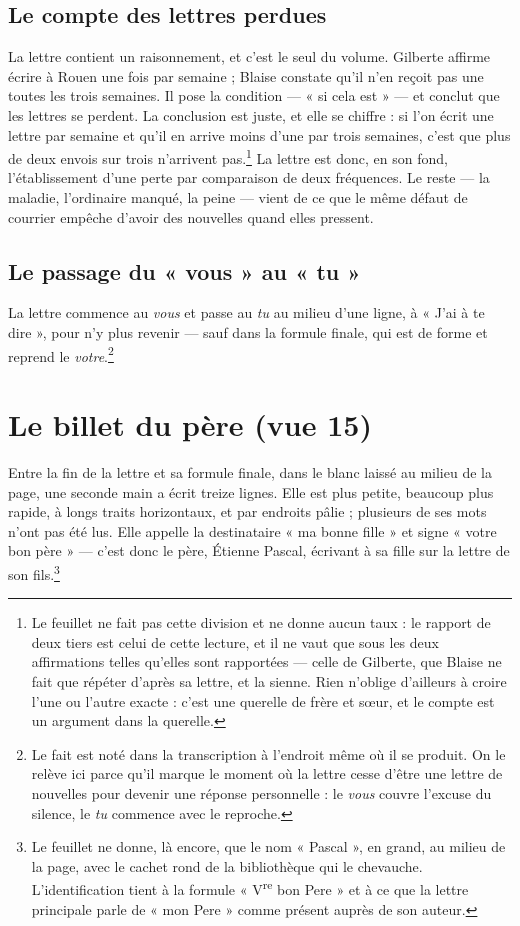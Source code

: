 \documentclass[11pt,a4paper]{article}
\begin{document}
\subsection*{Le compte des lettres perdues}

La lettre contient un raisonnement, et c'est le seul du volume. Gilberte
affirme écrire à Rouen une fois par semaine ; Blaise constate qu'il n'en reçoit
pas une toutes les trois semaines. Il pose la condition — « si cela est » — et
conclut que les lettres se perdent. La conclusion est juste, et elle se
chiffre : si l'on écrit une lettre par semaine et qu'il en arrive moins d'une
par trois semaines, c'est que plus de deux envois sur trois n'arrivent
pas.\footnote{Le feuillet ne fait pas cette division et ne donne aucun taux :
le rapport de deux tiers est celui de cette lecture, et il ne vaut que sous
les deux affirmations telles qu'elles sont rapportées — celle de Gilberte, que
Blaise ne fait que répéter d'après sa lettre, et la sienne. Rien n'oblige
d'ailleurs à croire l'une ou l'autre exacte : c'est une querelle de frère et
sœur, et le compte est un argument dans la querelle.} La lettre est donc, en
son fond, l'établissement d'une perte par comparaison de deux fréquences. Le
reste — la maladie, l'ordinaire manqué, la peine — vient de ce que le même
défaut de courrier empêche d'avoir des nouvelles quand elles pressent.

\subsection*{Le passage du « vous » au « tu »}

La lettre commence au \emph{vous} et passe au \emph{tu} au milieu d'une ligne,
à « J'ai à te dire », pour n'y plus revenir — sauf dans la formule finale, qui
est de forme et reprend le \emph{votre}.\footnote{Le fait est noté dans la
transcription à l'endroit même où il se produit. On le relève ici parce qu'il
marque le moment où la lettre cesse d'être une lettre de nouvelles pour
devenir une réponse personnelle : le \emph{vous} couvre l'excuse du silence,
le \emph{tu} commence avec le reproche.}

\section*{Le billet du père (vue 15)}

Entre la fin de la lettre et sa formule finale, dans le blanc laissé au milieu
de la page, une seconde main a écrit treize lignes. Elle est plus petite,
beaucoup plus rapide, à longs traits horizontaux, et par endroits pâlie ;
plusieurs de ses mots n'ont pas été lus. Elle appelle la destinataire « ma
bonne fille » et signe « votre bon père » — c'est donc le père, Étienne
Pascal, écrivant à sa fille sur la lettre de son fils.\footnote{Le feuillet ne
donne, là encore, que le nom « Pascal », en grand, au milieu de la page, avec
le cachet rond de la bibliothèque qui le chevauche. L'identification tient à
la formule « V\textsuperscript{re} bon Pere » et à ce que la lettre principale
parle de « mon Pere » comme présent auprès de son auteur.}
\end{document}
